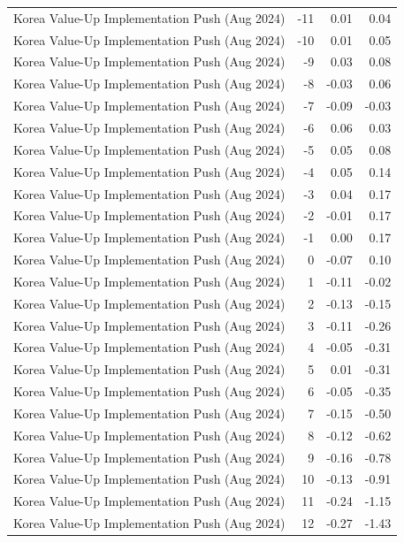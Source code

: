 \begin{table}
\begin{tabular}{lrrr}
Korea Value-Up Implementation Push (Aug 2024) & -11 & 0.01 & 0.04 \\
Korea Value-Up Implementation Push (Aug 2024) & -10 & 0.01 & 0.05 \\
Korea Value-Up Implementation Push (Aug 2024) & -9 & 0.03 & 0.08 \\
Korea Value-Up Implementation Push (Aug 2024) & -8 & -0.03 & 0.06 \\
Korea Value-Up Implementation Push (Aug 2024) & -7 & -0.09 & -0.03 \\
Korea Value-Up Implementation Push (Aug 2024) & -6 & 0.06 & 0.03 \\
Korea Value-Up Implementation Push (Aug 2024) & -5 & 0.05 & 0.08 \\
Korea Value-Up Implementation Push (Aug 2024) & -4 & 0.05 & 0.14 \\
Korea Value-Up Implementation Push (Aug 2024) & -3 & 0.04 & 0.17 \\
Korea Value-Up Implementation Push (Aug 2024) & -2 & -0.01 & 0.17 \\
Korea Value-Up Implementation Push (Aug 2024) & -1 & 0.00 & 0.17 \\
Korea Value-Up Implementation Push (Aug 2024) & 0 & -0.07 & 0.10 \\
Korea Value-Up Implementation Push (Aug 2024) & 1 & -0.11 & -0.02 \\
Korea Value-Up Implementation Push (Aug 2024) & 2 & -0.13 & -0.15 \\
Korea Value-Up Implementation Push (Aug 2024) & 3 & -0.11 & -0.26 \\
Korea Value-Up Implementation Push (Aug 2024) & 4 & -0.05 & -0.31 \\
Korea Value-Up Implementation Push (Aug 2024) & 5 & 0.01 & -0.31 \\
Korea Value-Up Implementation Push (Aug 2024) & 6 & -0.05 & -0.35 \\
Korea Value-Up Implementation Push (Aug 2024) & 7 & -0.15 & -0.50 \\
Korea Value-Up Implementation Push (Aug 2024) & 8 & -0.12 & -0.62 \\
Korea Value-Up Implementation Push (Aug 2024) & 9 & -0.16 & -0.78 \\
Korea Value-Up Implementation Push (Aug 2024) & 10 & -0.13 & -0.91 \\
Korea Value-Up Implementation Push (Aug 2024) & 11 & -0.24 & -1.15 \\
Korea Value-Up Implementation Push (Aug 2024) & 12 & -0.27 & -1.43 \\

\end{tabular}
\end{table}
